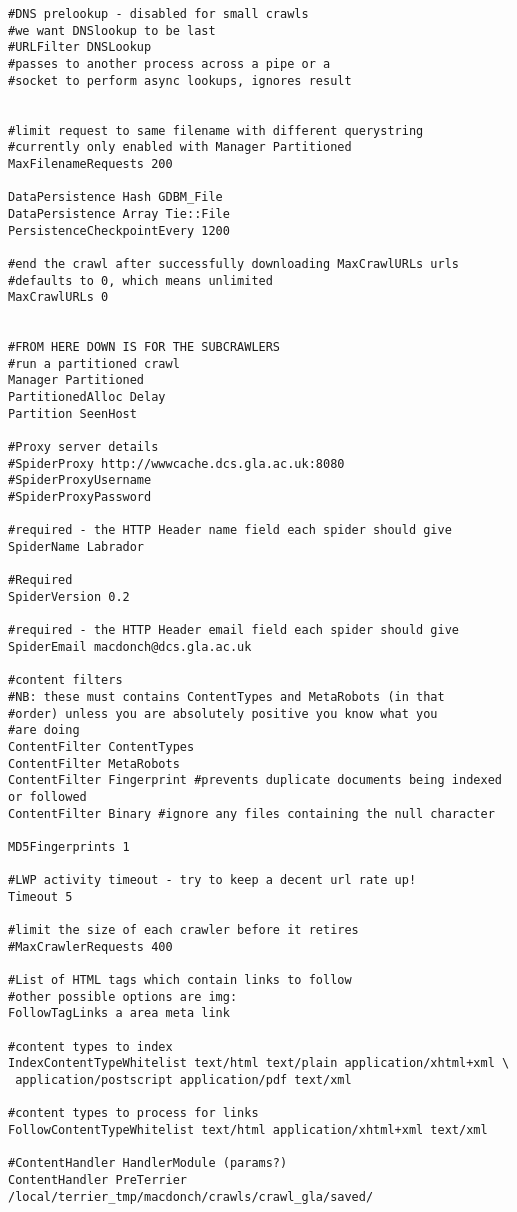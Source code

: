 \begin{verbatim}
#DNS prelookup - disabled for small crawls
#we want DNSlookup to be last
#URLFilter DNSLookup 
#passes to another process across a pipe or a 
#socket to perform async lookups, ignores result


#limit request to same filename with different querystring
#currently only enabled with Manager Partitioned
MaxFilenameRequests 200

DataPersistence Hash GDBM_File
DataPersistence Array Tie::File
PersistenceCheckpointEvery 1200

#end the crawl after successfully downloading MaxCrawlURLs urls
#defaults to 0, which means unlimited
MaxCrawlURLs 0


#FROM HERE DOWN IS FOR THE SUBCRAWLERS
#run a partitioned crawl
Manager Partitioned
PartitionedAlloc Delay
Partition SeenHost

#Proxy server details
#SpiderProxy http://wwwcache.dcs.gla.ac.uk:8080
#SpiderProxyUsername
#SpiderProxyPassword

#required - the HTTP Header name field each spider should give
SpiderName Labrador

#Required
SpiderVersion 0.2

#required - the HTTP Header email field each spider should give
SpiderEmail macdonch@dcs.gla.ac.uk

#content filters
#NB: these must contains ContentTypes and MetaRobots (in that
#order) unless you are absolutely positive you know what you
#are doing
ContentFilter ContentTypes
ContentFilter MetaRobots
ContentFilter Fingerprint #prevents duplicate documents being indexed or followed
ContentFilter Binary #ignore any files containing the null character

MD5Fingerprints 1

#LWP activity timeout - try to keep a decent url rate up!
Timeout 5

#limit the size of each crawler before it retires
#MaxCrawlerRequests 400

#List of HTML tags which contain links to follow
#other possible options are img:
FollowTagLinks a area meta link

#content types to index
IndexContentTypeWhitelist text/html text/plain application/xhtml+xml \
 application/postscript application/pdf text/xml 

#content types to process for links
FollowContentTypeWhitelist text/html application/xhtml+xml text/xml

#ContentHandler HandlerModule (params?)
ContentHandler PreTerrier /local/terrier_tmp/macdonch/crawls/crawl_gla/saved/



\end{verbatim}
